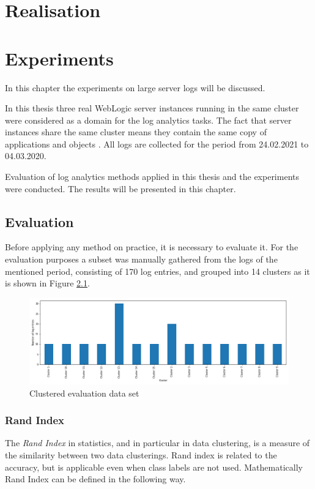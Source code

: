 \documentclass[thesis=M,english]{FITthesis}[2019/12/23]
\begin{document}
\chapter{Realisation}
\chapter{Experiments}
In this chapter the experiments on large server logs will be discussed. 

In this thesis three real WebLogic server instances running in the same cluster were considered as a domain for the log analytics tasks. The fact that server instances share the same cluster means they contain the same copy of applications and objects \cite{mi-mdw}. All logs are collected for the period from 24.02.2021 to 04.03.2020. 

Evaluation of log analytics methods applied in this thesis and the experiments were conducted. The results will be presented in this chapter.


\section{Evaluation}
Before applying any method on practice, it is necessary to evaluate it. For the evaluation purposes a subset was manually gathered from the logs of the mentioned period, consisting of 170 log entries, and grouped into 14 clusters as it is shown in Figure \ref{fig:eval-clustering}. 
 

\begin{figure}[h!]\centering
	\includegraphics[scale=0.34]{labeled_eval}
	\caption{Clustered evaluation data set}\label{fig:eval-clustering}
\end{figure}

\subsection{Rand Index}
The \textit{Rand Index} in statistics, and in particular in data clustering, is a measure of the similarity between two data clusterings. Rand index is related to the accuracy, but is applicable even when class labels are not used. 
Mathematically Rand Index can be defined in the following way. 
\end{document}
